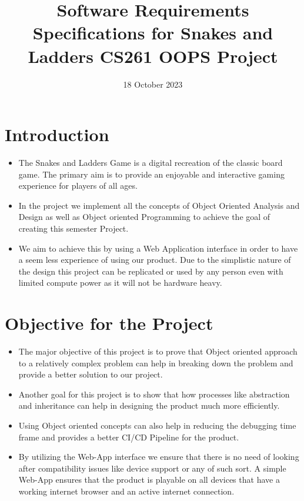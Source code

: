 \documentclass{article}
\title{Software Requirements Specifications for Snakes and Ladders CS261 OOPS Project}
\date{18 October 2023}
\begin{document}
\maketitle

\section{Introduction}
    \begin{itemize}
        \item The Snakes and Ladders Game is a digital recreation of the classic board game. The primary aim is to provide an enjoyable and interactive gaming experience for players of all ages.
        \item In the project we implement all the concepts of Object Oriented Analysis and Design as well as Object oriented Programming to achieve the goal of creating this semester Project.
        \item We aim to achieve this by using a Web Application interface in order to have a seem less experience of using our product. Due to the simplistic nature of the design this project can be replicated or used by any person even with limited compute power as it will not be hardware heavy.
    \end{itemize}

\section{Objective for the Project}
    \begin{itemize}
        \item The major objective of this project is to prove that Object oriented approach to a relatively complex problem can help in breaking down the problem and provide a better solution to our project.
        \item Another goal for this project is to show that how processes like abstraction and inheritance can help in designing the product much more efficiently.
        \item Using Object oriented concepts can also help in reducing the debugging time frame and provides a better CI/CD Pipeline for the product.
        \item By utilizing the Web-App interface we ensure that there is no need of looking after compatibility issues like device support or any of such sort. A simple Web-App ensures that the product is playable on all devices that have a working internet browser and an active internet connection.
    \end{itemize}
\end{document}
